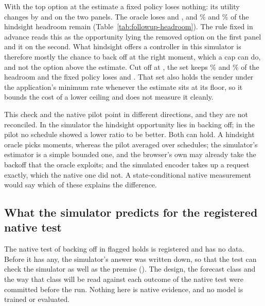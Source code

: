 \begin{table}[t]
\centering\small
\resizebox{\linewidth}{!}{}
\caption{Hindsight headroom in the simulator when the option set is cut off. Headroom is the hindsight oracle minus the fixed ratio selected for that set; the share is of the reference set's headroom; the last column is the truncated oracle against the reference set's fixed ratio (for the reference set, its own headroom). Brackets are family-level $t$ intervals.}
\label{tab:followup-headroom}
\end{table}

With the top option at the estimate a fixed policy loses nothing: its utility changes by \TypedHeadCapRepFixedChange{} \TypedHeadCapRepFixedChangeT{} and \TypedHeadCapSealFixedChange{} \TypedHeadCapSealFixedChangeT{} on the two panels. The oracle loses \TypedHeadCapRepOracleChange{} and \TypedHeadCapSealOracleChange{}, and \TypedHeadCapRepShare\% and \TypedHeadCapSealShare\% of the hindsight headroom remain (Table~\ref{tab:followup-headroom}). The rule fixed in advance reads this as the opportunity lying \TypedHeadCapRepReading{} the removed option on the first panel and \TypedHeadCapSealReading{} it on the second. What hindsight offers a controller in this simulator is therefore mostly the chance to back off at the right moment, which a cap can do, and not the option above the estimate. Cut off at \TypedHeadLowTop{}, the set keeps \TypedHeadLowRepShare\% and \TypedHeadLowSealShare\% of the headroom and the fixed policy loses \TypedHeadLowRepFixedChange{} and \TypedHeadLowSealFixedChange{}. That set also holds the sender under the application's minimum rate whenever the estimate sits at its floor, so it bounds the cost of a lower ceiling and does not measure it cleanly.

This check and the native pilot point in different directions, and they are not reconciled. In the simulator the hindsight opportunity lies in backing off; in the pilot no schedule showed a lower ratio to be better. Both can hold. A hindsight oracle picks moments, whereas the pilot averaged over schedules; the simulator's estimator is a simple bounded one, and the browser's own may already take the backoff that the oracle exploits; and the simulated encoder takes up a request exactly, which the native one did not. A state-conditional native measurement would say which of these explains the difference.
\fi

\ifdefined\TypedCastBuiltClass
\subsection{What the simulator predicts for the registered native test}
\label{sec:typed-b1-forecast}
The native test of backing off in flagged holds is registered and has no data. Before it has any, the simulator's answer was written down, so that the test can check the simulator as well as the premise (). The design, the forecast class and the way that class will be read against each outcome of the native test were committed before the run. Nothing here is native evidence, and no model is trained or evaluated.


